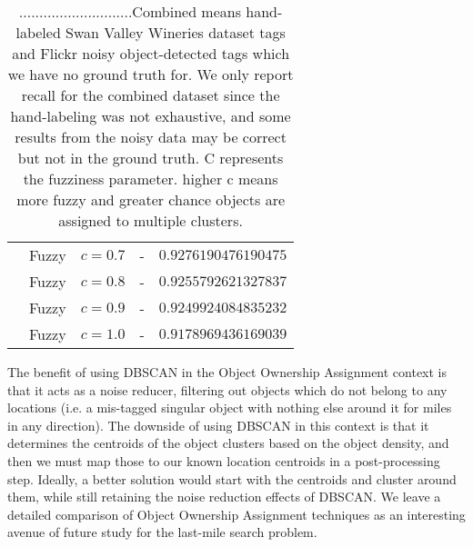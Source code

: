 {\begin{table}[h!]
\begin{center}
\begin{tabular}{ |c|c|c|c|c| }
				& Fuzzy & $c = 0.7$ & - & $0.9276190476190475$  \\ 
				& Fuzzy & $c = 0.8$ & - & $0.9255792621327837$  \\ 
				& Fuzzy & $c = 0.9$ & - & $0.9249924084835232$  \\ 
				& Fuzzy & $c = 1.0$ & - & $0.9178969436169039$  \\ 
			\hline
		\end{tabular}
		\caption{ ............................Combined means hand-labeled Swan Valley Wineries dataset tags and Flickr noisy object-detected tags which we have no ground truth for. We only report recall for the combined dataset since the hand-labeling was not exhaustive, and some results from the noisy data may be correct but not in the ground truth. C represents the fuzziness parameter. higher c means more fuzzy and greater chance objects are assigned to multiple clusters.}
        \label{table:clustering}
	\end{center}
\end{table}
}





The benefit of using DBSCAN in the Object Ownership Assignment context is that it acts as a noise reducer, filtering out objects which do not belong to any locations (i.e. a mis-tagged singular object with nothing else around it for miles in any direction). 
The downside of using DBSCAN in this context is that it determines the centroids of the object clusters based on the object density, and then we must map those to our known location centroids in a post-processing step. 
Ideally, a better solution would start with the centroids and cluster around them, while still retaining the noise reduction effects of DBSCAN.
We leave a detailed comparison of Object Ownership Assignment techniques as an interesting avenue of future study for the last-mile search problem.


